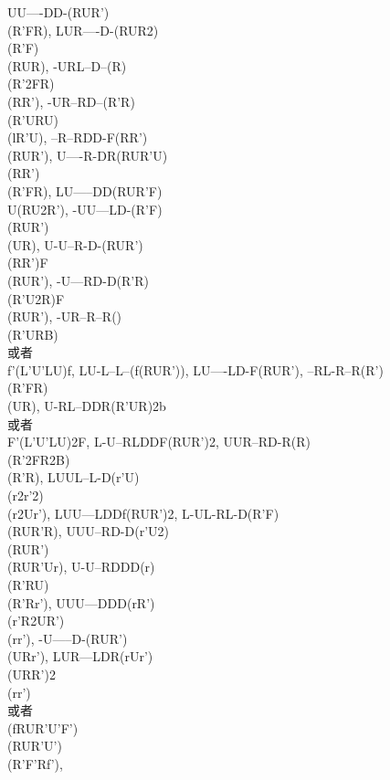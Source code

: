 \documentclass{article}
\begin{document}
{    {UU----DD-}{(RUR')\\(R'FR)}, %
    {LUR----D-}{(RUR2)\\(R'F)\\(RUR)}, %
    {-URL--D--}{(R)\\(R'2FR)\\(RR')}, %
    {-UR--RD--}{(R'R)\\(R'URU)\\(lR'U)}, %
    {--R--RDD-}{F(RR')\\(RUR')}, %
    {U----R-DR}{(RUR'U)\\(RR')\\(R'FR)}, %
    {LU-----DD}{(RUR'F)\\U(RU2R')}, %
    {-UU---LD-}{(R'F)\\(RUR')\\(UR)}, %
    {U-U--R-D-}{(RUR')\\(RR')F\\(RUR')}, %
    {-U---RD-D}{(R'R)\\(R'U2R)F\\(RUR')}, %
    {-UR--R--R}{()\\(R'URB)\\或者\\f'(L'U'LU)f}, %
    {LU-L--L--}{(f(RUR'))}, %
    {LU----LD-}{F(RUR')}, %
    {--RL-R--R}{(R')\\(R'FR)\\(UR)}, %
    {U-RL--DDR}{(R'UR)2b\\或者\\F'(L'U'LU)2F}, %
    {L-U--RLDD}{F(RUR')2}, %
    {UUR--RD-R}{(R)\\(R'2FR2B)\\(R'R)}, %
    {LUUL--L-D}{(r'U)\\(r2r'2)\\(r2Ur')}, %
    {LUU---LDD}{f(RUR')2}, %
    {L-UL-RL-D}{(R'F)\\(RUR'R)}, %
    {UUU--RD-D}{(r'U2)\\(RUR')\\(RUR'Ur)}, %
    {U-U--RDDD}{(r)\\(R'RU)\\(R'Rr')}, %
    {UUU---DDD}{(rR')\\(r'R2UR')\\(rr')}, %
    {-U-----D-}{(RUR')\\(URr')}, %
    {LUR---LDR}{(rUr')\\(URR')2\\(rr')\\或者\\(fRUR'U'F')\\(RUR'U')\\(R'F'Rf')}, %
}
\end{document}
